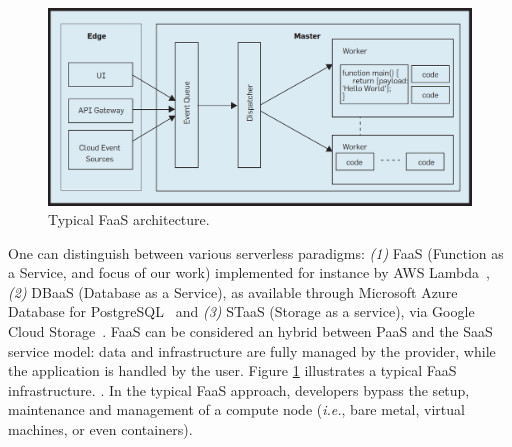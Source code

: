 \begin{figure}[!t]
\begin{center}
\includegraphics[scale=0.2]{bilder/FaaS_architecture.png}
\captionsetup[table]{justification=centering, labelfont=bf}
\caption{ Typical FaaS architecture.\label{fig:faas_arch}}
\end{center}
\end{figure}
One can distinguish between various serverless paradigms: \emph{(1)} FaaS (Function as a Service, and focus of our work) implemented for instance by \gls{AWS} Lambda~\cite{AWSLambda}, \emph{(2)} DBaaS (Database as a Service), as available through Microsoft Azure Database for PostgreSQL~\cite{AzureDBaaS} and \emph{(3)} STaaS (Storage as a service), via Google Cloud Storage~\cite{serverlessgoogle}. 
FaaS can be considered an hybrid between \gls{PaaS} and the \gls{SaaS} service model: data and infrastructure are fully managed by the provider, while the application is handled by the user.
Figure \ref{fig:faas_arch} illustrates a typical FaaS infrastructure.
.
In the typical FaaS approach, developers bypass the setup, maintenance and management of a compute node (\emph{i.e.}, bare metal, virtual machines, or even containers). %
